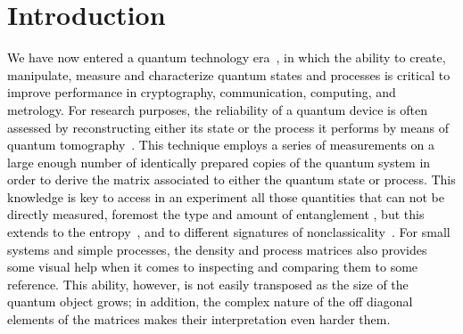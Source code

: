 \documentclass[pra,reprint,showkeys,showpacs,times,superscriptaddress]{revtex4-1}
\newcommand{\red}{\textcolor{black}}
\begin{document}


\maketitle

\section{Introduction}\label{Intro}

\red{We have now entered a quantum technology era~\cite{Dowling1655}, in which the ability to create, manipulate, \red{measure} and characterize quantum states and processes is critical to improve performance in cryptography, communication, computing, and metrology. For research purposes, the reliability of a quantum device is often assessed by reconstructing either its state or the process it performs by means of quantum tomography~\cite{Breitenbach97,White99,Banaszek00,James01,Dariano03,ParisBook,Blume10,Rehacek10,Cooper14}. This technique employs a series of measurements on a large enough number of identically prepared copies of the quantum system in order to derive the matrix associated to either the quantum state or process. This knowledge is key to access in an experiment all those quantities that can not be directly measured, foremost the type and amount of entanglement \cite{Vedral97,Wootters98,Dur00,Giedke01}, but this extends to the entropy~\cite{NielsonChuang}, and to different signatures of nonclassicality~\cite{PhysRev.131.2766,PhysRevLett.10.277,Vogel00,Ourjoumtsev06,Haroche08}. For small systems and simple processes, the density and process matrices also provides some visual help when it comes to inspecting and comparing them to some reference. This ability, however, is not easily transposed as the size of the quantum object grows; in addition, the complex nature of the off diagonal elements of the matrices makes their interpretation even harder them.} 
\end{document}
